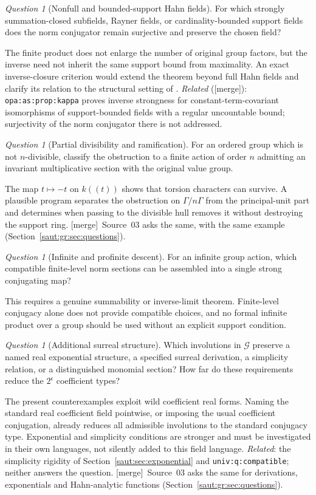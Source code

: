 \documentclass[11pt]{article}
\theoremstyle{definition}
\theoremstyle{remark}
\newtheorem{question}[theorem]{Question}
\newcommand{\lbl}[1]{\nolinkurl{#1}}%
\newcommand{\cc}{\mathfrak c}
\newcommand{\mergetag}{\textup{[merge]}}
\numberwithin{equation}{section}
\begin{document}
\begin{question}[Nonfull and bounded-support Hahn fields]\label{saut:fs:q:nonfull}
For which strongly summation-closed subfields, Rayner fields, or cardinality-bounded
support fields does the norm conjugator remain surjective and preserve the chosen
field?
\end{question}
The finite product does not enlarge the number of original group factors, but the
inverse need not inherit the same support bound from maximality. An exact
inverse-closure criterion would extend the theorem beyond full Hahn fields and clarify
its relation to the structural setting of \cite{KS}. \emph{Related} (\mergetag):
\lbl{opa:as:prop:kappa} proves inverse strongness for constant-term-covariant
isomorphisms of support-bounded fields with a regular uncountable bound; surjectivity
of the norm conjugator there is not addressed.

\begin{question}[Partial divisibility and ramification]\label{saut:fs:q:divisibility}
For an ordered group which is not $n$-divisible, classify the obstruction to a finite
action of order $n$ admitting an invariant multiplicative section with the original
value group.
\end{question}
The map $t\mapsto-t$ on $k((t))$ shows that torsion characters can survive. A
plausible program separates the obstruction on $\Gamma/n\Gamma$ from the
principal-unit part and determines when passing to the divisible hull removes it
without destroying the support ring. \mergetag\ Source~03 asks the same, with the
same example (Section~\ref{saut:gr:sec:questions}).

\begin{question}[Infinite and profinite descent]\label{saut:fs:q:infinite}
For an infinite group action, which compatible finite-level norm sections can be
assembled into a single strong conjugating map?
\end{question}
This requires a genuine summability or inverse-limit theorem. Finite-level conjugacy
alone does not provide compatible choices, and no formal infinite product over a group
should be used without an explicit support condition.

\begin{question}[Additional surreal structure]\label{saut:fs:q:structure}
Which involutions in $\mathcal G$ preserve a named real exponential structure, a
specified surreal derivation, a simplicity relation, or a distinguished monomial
section? How far do these requirements reduce the $2^{\cc}$ coefficient types?
\end{question}
The present counterexamples exploit wild coefficient real forms. Naming the standard
real coefficient field pointwise, or imposing the usual coefficient conjugation,
already reduces all admissible involutions to the standard conjugacy type. Exponential
and simplicity conditions are stronger and must be investigated in their own
languages, not silently added to this field language. \emph{Related}: the simplicity
rigidity of Section~\ref{saut:sec:exponential} and \lbl{univ:q:compatible}; neither
answers the question. \mergetag\ Source~03 asks the same for derivations, exponentials
and Hahn-analytic functions (Section~\ref{saut:gr:sec:questions}).
\end{document}
